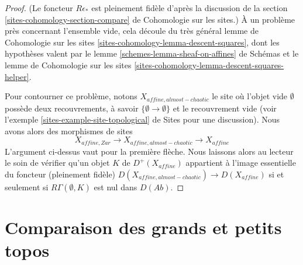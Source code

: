 \begin{proof}
(Le foncteur $R\epsilon_*$ est pleinement fidèle d'après la discussion de la
section \ref{sites-cohomology-section-compare} de Cohomologie sur les sites.)
À un problème près concernant l'ensemble vide,
cela découle du très général lemme de Cohomologie sur les sites
\ref{sites-cohomology-lemma-descent-squares}, dont les hypothèses valent par le
lemme \ref{schemes-lemma-sheaf-on-affines} de Schémas et le
lemme de Cohomologie sur les sites
\ref{sites-cohomology-lemma-descent-squares-helper}.

\medskip\noindent
Pour contourner ce problème, notons $X_{affine, almost-chaotic}$
le site où l'objet vide $\emptyset$ possède deux recouvrements,
à savoir $\{\emptyset \to \emptyset\}$ et le recouvrement vide
(voir l'exemple \ref{sites-example-site-topological} de Sites pour une
discussion). Nous avons alors des morphismes de sites
$$
X_{affine, Zar} \to X_{affine, almost-chaotic} \to X_{affine}
$$
L'argument ci-dessus vaut pour la première flèche. Nous laissons alors
au lecteur le soin de vérifier qu'un objet $K$ de $D^+(X_{affine})$
appartient à l'image essentielle du foncteur (pleinement fidèle)
$D(X_{affine, almost-chaotic}) \to D(X_{affine})$ si et seulement
si $R\Gamma(\emptyset, K)$ est nul dans $D(\textit{Ab})$.
\end{proof}









\section{Comparaison des grands et petits topos}
\label{section-compare}

